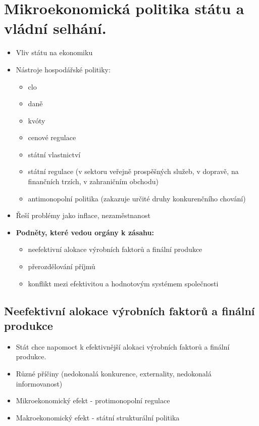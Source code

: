 \clearpage
\section{Mikroekonomická politika státu a vládní selhání.}
\begin{itemize}
    \item Vliv státu na ekonomiku
    \item Nástroje hospodářské politiky:
    \begin{itemize}
        \item clo
        \item daně
        \item kvóty
        \item cenové regulace
        \item státní vlastnictví
        \item státní regulace (v sektoru veřejně prospěšných služeb, v dopravě, na finančních trzích,
        v zahraničním obchodu)
        \item antimonopolní politika (zakazuje určité druhy konkurenčního chování)
    \end{itemize}
    \item Řeší problémy jako inflace, nezaměstnanost
    \item \textbf{Podněty, které vedou orgány k zásahu:}
    \begin{itemize}
        \item neefektivní alokace výrobních faktorů a finální produkce
        \item přerozdělování příjmů
        \item konflikt mezi efektivitou a hodnotovým systémem společnosti
    \end{itemize}
\end{itemize}

\subsection{Neefektivní alokace výrobních faktorů a finální produkce}
\begin{itemize}
    \item Stát chce napomoct k efektivnější alokaci výrobních faktorů a finální produkce.
    \item Různé příčiny (nedokonalá konkurence, externality, nedokonalá informovanost)
    \item Mikroekonomický efekt - protimonopolní regulace
    \item Makroekonomický efekt - státní strukturální politika
\end{itemize}


